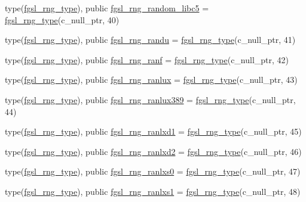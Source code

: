\begin{DoxyCompactItemize}
\item 
type(\hyperlink{structfgsl_1_1fgsl__rng__type}{fgsl\-\_\-rng\-\_\-type}), public \hyperlink{classfgsl_a642018575871b9b658058f7540ffce03}{fgsl\-\_\-rng\-\_\-random\-\_\-libc5} = \hyperlink{structfgsl_1_1fgsl__rng__type}{fgsl\-\_\-rng\-\_\-type}(c\-\_\-null\-\_\-ptr, 40)
\item 
type(\hyperlink{structfgsl_1_1fgsl__rng__type}{fgsl\-\_\-rng\-\_\-type}), public \hyperlink{classfgsl_a27e0ade0cf0e6155c944ca520547c4a8}{fgsl\-\_\-rng\-\_\-randu} = \hyperlink{structfgsl_1_1fgsl__rng__type}{fgsl\-\_\-rng\-\_\-type}(c\-\_\-null\-\_\-ptr, 41)
\item 
type(\hyperlink{structfgsl_1_1fgsl__rng__type}{fgsl\-\_\-rng\-\_\-type}), public \hyperlink{classfgsl_a40a3682ade652628973e925312f78240}{fgsl\-\_\-rng\-\_\-ranf} = \hyperlink{structfgsl_1_1fgsl__rng__type}{fgsl\-\_\-rng\-\_\-type}(c\-\_\-null\-\_\-ptr, 42)
\item 
type(\hyperlink{structfgsl_1_1fgsl__rng__type}{fgsl\-\_\-rng\-\_\-type}), public \hyperlink{classfgsl_a52505d0b341c829d785f2a0005575a40}{fgsl\-\_\-rng\-\_\-ranlux} = \hyperlink{structfgsl_1_1fgsl__rng__type}{fgsl\-\_\-rng\-\_\-type}(c\-\_\-null\-\_\-ptr, 43)
\item 
type(\hyperlink{structfgsl_1_1fgsl__rng__type}{fgsl\-\_\-rng\-\_\-type}), public \hyperlink{classfgsl_a1403f9766b272caac077f138b24156ba}{fgsl\-\_\-rng\-\_\-ranlux389} = \hyperlink{structfgsl_1_1fgsl__rng__type}{fgsl\-\_\-rng\-\_\-type}(c\-\_\-null\-\_\-ptr, 44)
\item 
type(\hyperlink{structfgsl_1_1fgsl__rng__type}{fgsl\-\_\-rng\-\_\-type}), public \hyperlink{classfgsl_a524c5eebeb98cf095b5bfe9bde105de5}{fgsl\-\_\-rng\-\_\-ranlxd1} = \hyperlink{structfgsl_1_1fgsl__rng__type}{fgsl\-\_\-rng\-\_\-type}(c\-\_\-null\-\_\-ptr, 45)
\item 
type(\hyperlink{structfgsl_1_1fgsl__rng__type}{fgsl\-\_\-rng\-\_\-type}), public \hyperlink{classfgsl_ab9c54c86c74196b01b8038402c43038a}{fgsl\-\_\-rng\-\_\-ranlxd2} = \hyperlink{structfgsl_1_1fgsl__rng__type}{fgsl\-\_\-rng\-\_\-type}(c\-\_\-null\-\_\-ptr, 46)
\item 
type(\hyperlink{structfgsl_1_1fgsl__rng__type}{fgsl\-\_\-rng\-\_\-type}), public \hyperlink{classfgsl_a7114194063748411f9f00507745269fa}{fgsl\-\_\-rng\-\_\-ranlxs0} = \hyperlink{structfgsl_1_1fgsl__rng__type}{fgsl\-\_\-rng\-\_\-type}(c\-\_\-null\-\_\-ptr, 47)
\item 
type(\hyperlink{structfgsl_1_1fgsl__rng__type}{fgsl\-\_\-rng\-\_\-type}), public \hyperlink{classfgsl_aa3756069479859f5b94693230b23f052}{fgsl\-\_\-rng\-\_\-ranlxs1} = \hyperlink{structfgsl_1_1fgsl__rng__type}{fgsl\-\_\-rng\-\_\-type}(c\-\_\-null\-\_\-ptr, 48)

\end{DoxyCompactItemize}
